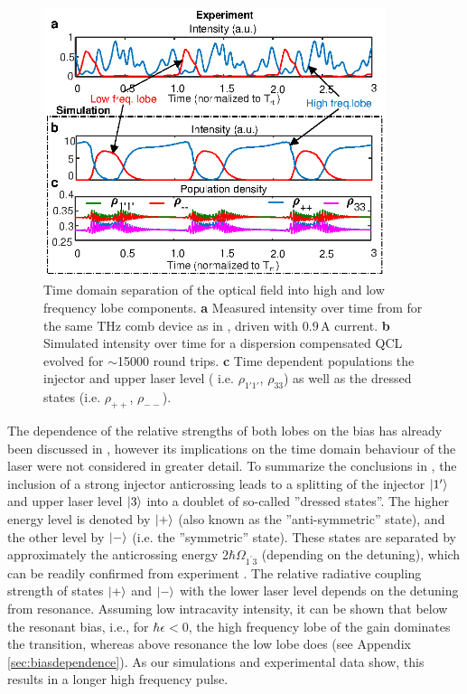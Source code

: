 \documentclass[10pt,letterpaper]{article}%
\begin{document}
\begin{figure}[h!]
	\begin{center}
		\includegraphics[width=10cm]{figs/TEMPHOLEBURNING_EXPERIMENT.eps}
	\end{center}
	\caption{Time domain separation of the optical field into high and low
		frequency lobe components. \textbf{a} Measured intensity over time from
		\cite{burghoff2015evaluating} for the same THz comb device as in
		\cite{burghoff2014terahertz}, driven with $0.9{\,}\mathrm{A}$ current.
		\textbf{b} Simulated intensity over time for a dispersion compensated QCL
		evolved for $\sim$15000 round trips. \textbf{c} Time dependent populations the
		injector and upper laser level ( i.e. $\rho_{1'1'}$, $\rho_{33}$) as well as the dressed states (i.e. $\rho_{++}$, $\rho_{--}$).}%
	\label{fig:img06}%
\end{figure}

The dependence of the relative strengths of both lobes on the bias\textrm{
}has already been discussed in \cite{dupont2010simplified}, however its
implications on the time domain behaviour of the laser were not considered in
greater detail. To summarize the conclusions in \cite{dupont2010simplified},
the inclusion of a strong injector anticrossing leads to a splitting of the
injector $\Ket{1'}$ and upper laser level $\Ket{3}$ into a doublet of
so-called ''dressed states''. The higher energy level is denoted by $\Ket{+}$
(also known as the ''anti-symmetric'' state), and the other level by $\Ket{-}$
(i.e. the ''symmetric'' state). These states are separated by approximately
the anticrossing energy $2\hbar\Omega_{1^{\prime}3}$ (depending on the
detuning), which can be readily confirmed from experiment
\cite{burghoff2014terahertz}. The relative radiative coupling strength of
states $\Ket{+}$ and $\Ket{-}$ with the lower laser level depends on the
detuning from resonance. Assuming low intracavity intensity, it can be shown
that below the resonant bias, i.e., for $\hbar\epsilon<0$, the high frequency
lobe of the gain dominates the transition, whereas above resonance the low
lobe does (see Appendix \ref{sec:biasdependence}). As our simulations and
experimental data show, this results in a longer high frequency pulse.
\end{document}
